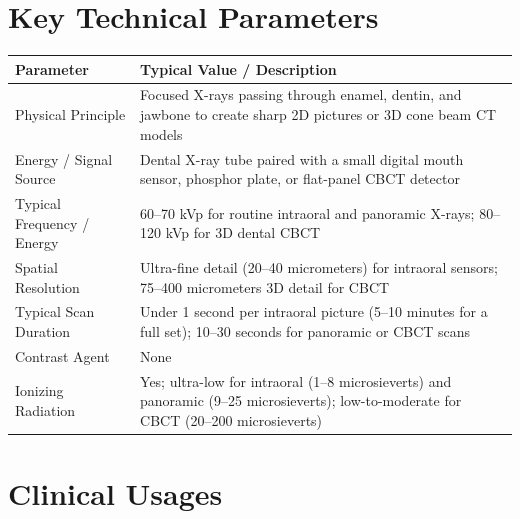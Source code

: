 \section{Key Technical Parameters}
\noindent
\begin{tabularx}{\textwidth}{@{}l X@{}}
\toprule
\textbf{Parameter} & \textbf{Typical Value / Description} \\
\midrule
Physical Principle & Focused X-rays passing through enamel, dentin, and jawbone to create sharp 2D pictures or 3D cone beam CT models \\
Energy / Signal Source & Dental X-ray tube paired with a small digital mouth sensor, phosphor plate, or flat-panel CBCT detector \\
Typical Frequency / Energy & 60--70 kVp for routine intraoral and panoramic X-rays; 80--120 kVp for 3D dental CBCT \\
Spatial Resolution & Ultra-fine detail (20--40 micrometers) for intraoral sensors; 75--400 micrometers 3D detail for CBCT \\
Typical Scan Duration & Under 1 second per intraoral picture (5--10 minutes for a full set); 10--30 seconds for panoramic or CBCT scans \\
Contrast Agent & None \\
Ionizing Radiation & Yes; ultra-low for intraoral (1--8 microsieverts) and panoramic (9--25 microsieverts); low-to-moderate for CBCT (20--200 microsieverts) \\
\bottomrule
\end{tabularx}

\section{Clinical Usages}

